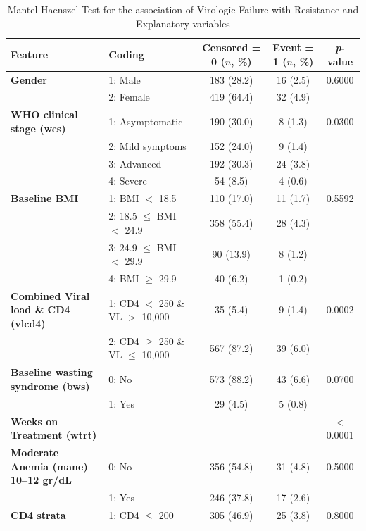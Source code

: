 \documentclass[10pt]{NSP1}
\begin{document}
\begin{table}[!htbp]
    \centering
    \caption{Mantel-Haenszel Test for the association of Virologic Failure with Resistance and Explanatory variables}\label{tab:appendix3}
    \begin{tabularx}{\textwidth}{@{}p{6.5cm} X c c c@{}}
        \toprule
        \textbf{Feature} & \textbf{Coding} & \textbf{Censored = 0 ($n$, \%)} & \textbf{Event = 1 ($n$, \%)} & \textbf{\textit{p}-value} \\
        \midrule
        \textbf{Gender} & 1: Male & 183 (28.2) & 16 (2.5) & 0.6000 \\
        & 2: Female & 419 (64.4) & 32 (4.9) &\\
        \addlinespace
        \textbf{WHO clinical stage (wcs)} & 1: Asymptomatic & 190 (30.0) & 8 (1.3)& 0.0300 \\
        & 2: Mild symptoms & 152 (24.0) & 9 (1.4)& \\
        & 3: Advanced  & 192 (30.3) & 24 (3.8) &\\
        & 4: Severe & 54 (8.5) & 4 (0.6) &\\
        \addlinespace
        \textbf{Baseline BMI} & 1: BMI $<$ 18.5 & 110 (17.0) & 11 (1.7) & 0.5592 \\
        & 2: 18.5 $\le$ BMI $<$ 24.9 & 358 (55.4) & 28 (4.3) & \\
        & 3: 24.9 $\le$ BMI $<$ 29.9 & 90 (13.9) & 8 (1.2) & \\
        & 4: BMI $\ge$ 29.9 & 40 (6.2) & 1 (0.2) & \\
        \addlinespace
        \textbf{Combined Viral load \& CD4 (vlcd4)} &  1: CD4 $<$ 250 \& VL $>$ 10,000 & 35 (5.4) & 9 (1.4) & 0.0002 \\
        & 2: CD4 $\ge$ 250 \& VL $\le$ 10,000 & 567 (87.2) & 39 (6.0)& \\
        \addlinespace
        \textbf{Baseline wasting syndrome (bws)} & 0: No & 573 (88.2) & 43 (6.6) & 0.0700 \\
        & 1: Yes & 29 (4.5) & 5 (0.8) & \\
        \addlinespace
        \textbf{Weeks on Treatment (wtrt)} & & & & $<$0.0001 \\
        \addlinespace
        \textbf{Moderate Anemia (mane) 10--12 gr/dL}  & 0: No & 356 (54.8) & 31 (4.8) & 0.5000  \\
        & 1: Yes & 246 (37.8) & 17 (2.6)& \\
        \addlinespace
        \textbf{CD4 strata} & 1: CD4 $\le$ 200 & 305 (46.9) & 25 (3.8) & 0.8000 \\

\end{tabularx}
\end{table}
\end{document}

